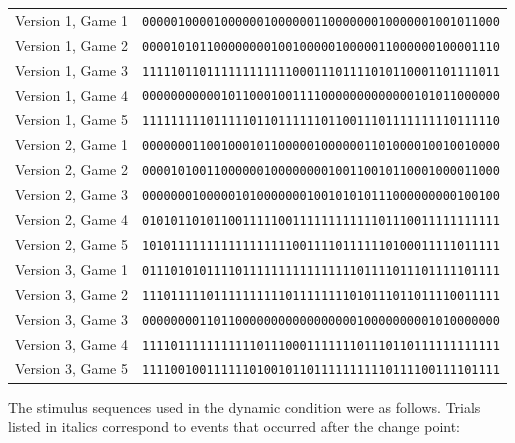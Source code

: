 \documentclass[authoryear]{elsarticle}
\begin{document}
\begin{center}
\begin{tabular}{l|l}
Version 1, Game 1 & \texttt{00000100001000000100000011000000010000001001011000}\\
Version 1, Game 2 & \texttt{00001010110000000010010000010000011000000100001110}\\
Version 1, Game 3 & \texttt{11111011011111111111100011101111010110001101111011}\\
Version 1, Game 4 & \texttt{00000000000101100010011110000000000000101011000000}\\
Version 1, Game 5 & \texttt{11111111101111101101111110110011101111111110111110}\\ \hline
Version 2, Game 1 & \texttt{00000001100100010110000010000001101000010010010000}\\
Version 2, Game 2 & \texttt{00001010011000000100000000100110010110001000011000}\\
Version 2, Game 3 & \texttt{00000001000001010000000100101010111000000000100100}\\
Version 2, Game 4 & \texttt{01010110101100111110011111111111101110011111111111}\\
Version 2, Game 5 & \texttt{10101111111111111111100111101111110100011111011111}\\ \hline
Version 3, Game 1 & \texttt{01110101011110111111111111111101111011101111101111}\\
Version 3, Game 2 & \texttt{11101111101111111111011111111010111011011110011111}\\
Version 3, Game 3 & \texttt{00000000110110000000000000000010000000001010000000}\\
Version 3, Game 4 & \texttt{11110111111111110111000111111101110110111111111111}\\
Version 3, Game 5 & \texttt{11110010011111101001011011111111110111100111101111}\\
\end{tabular}
\end{center}


\noindent
The stimulus sequences used in the dynamic condition were as follows. Trials listed in italics correspond to events that occurred after the change point:
\end{document}
